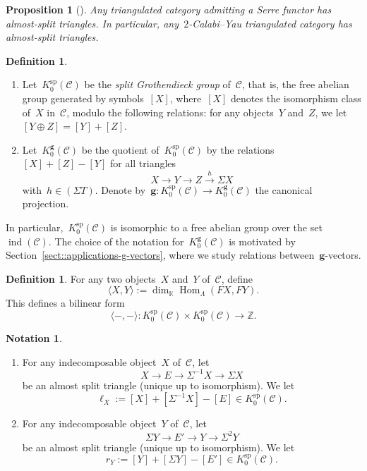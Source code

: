 \documentclass{amsart}
\newtheorem{proposition}[theorem]{Proposition}
\theoremstyle{definition}
\newtheorem{definition}[theorem]{Definition}
\newtheorem{notation}[theorem]{Notation}
\newcommand{\Z}{\mathbb{Z}} %
\renewcommand{\b}[1]{{\boldsymbol{#1}}} %
\newcommand{\darkblue}{\color{darkblue}} %
\newcommand{\defn}[1]{\textsl{\darkblue #1}} %
\newcommand{\pg}[1]{\todo[color=green!30]{#1 \\ \hfill --- PG.}}
\newcommand{\field}{\mathbb{K}}
\newcommand{\cat}{\mathcal{C}}
\newcommand{\Hom}[1]{\operatorname{Hom}_{#1}}
\newcommand{\susp}{\Sigma}
\newcommand{\spl}{\operatorname{sp}}
\newcommand{\Ksp}{K_0^{\spl}}
\newcommand{\Kg}{K_0^{\b{g}}}
\newcommand{\ind}{\operatorname{ind}}
\begin{document}
\begin{proposition}[]\pg{Cite Happel}
 Any triangulated category admitting a Serre functor has almost-split triangles.  In particular, any~$2$-Calabi--Yau triangulated category has almost-split triangles.
\end{proposition}


\begin{definition}\label{defi::grothendieck-group}
 \begin{enumerate}
  \item Let~$\Ksp(\cat)$ be the \defn{split Grothendieck group} of~$\cat$, that is, the free abelian group generated by symbols~$[X]$, where~$[X]$ denotes the isomorphism class of~$X$ in~$\cat$, modulo the following relations: for any objects~$Y$ and~$Z$, we let~$[Y\oplus Z] = [Y] + [Z]$. 
  
  \item Let~$\Kg(\cat)$ be the quotient of~$\Ksp(\cat)$ by the relations~$[X]+[Z]-[Y]$ for all triangles
  \[
   X\xrightarrow{} Y \xrightarrow{} Z \xrightarrow{h} \susp X
  \]
  with~$h\in (\susp T)$.  Denote by~$\b g:\Ksp(\cat) \to \Kg(\cat)$ the canonical projection.

 \end{enumerate}

 
\end{definition}
In particular,~$\Ksp(\cat)$ is isomorphic to a free abelian group over the set~$\ind(\cat)$.  The choice of the notation for~$\Kg(\cat)$ is motivated by Section~\ref{sect::applications-g-vectors}, where we study relations between~$\b g$-vectors.

\begin{definition}
 For any two objects~$X$ and~$Y$ of~$\cat$, define
 \[
  \langle X, Y \rangle := \dim_{\field} \Hom{\Lambda}(FX,FY).
 \]
 This defines a bilinear form
 \[
  \langle -,-\rangle : \Ksp(\cat) \times \Ksp(\cat) \xrightarrow{} \Z.
 \]
\end{definition}

\begin{notation}
\begin{enumerate}
 \item For any indecomposable object~$X$ of~$\cat$, let
 \[
  X \to E \to \susp^{-1} X \to \susp X
 \]
 be an almost split triangle (unique up to isomorphism).  We let
 \[
  \ell_X := [X] + [\susp^{-1} X]  - [E] \in \Ksp(\cat).
 \]
 
 \item For any indecomposable object~$Y$ of~$\cat$, let
 \[
  \susp Y \to E' \to  Y \to \susp^2 Y
 \]
 be an almost split triangle (unique up to isomorphism).  We let
 \[
  r_Y := [Y] + [\susp Y]  - [E'] \in \Ksp(\cat).
 \]
\end{enumerate}
\end{notation}
\end{document}
